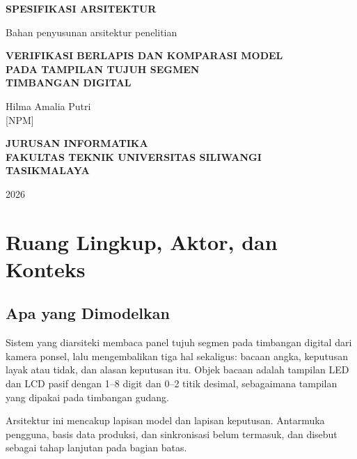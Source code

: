\documentclass[12pt,a4paper,oneside]{report}
\begin{document}
\begin{titlepage}
  \centering
  \vspace*{0.5cm}
  {\bfseries\normalsize SPESIFIKASI ARSITEKTUR\par}
  \vspace{0.4cm}
  {\normalsize Bahan penyusunan arsitektur penelitian\par}
  \vspace{1.2cm}
  {\bfseries\normalsize VERIFIKASI BERLAPIS DAN KOMPARASI MODEL\\[0.2cm]
   PADA TAMPILAN TUJUH SEGMEN\\[0.2cm] TIMBANGAN DIGITAL\par}
  \vspace{2cm}
  {\normalsize Hilma Amalia Putri\\[0.2cm] [NPM]\par}
  \vspace{2cm}
  {\bfseries\normalsize JURUSAN INFORMATIKA\\[0.2cm]
   FAKULTAS TEKNIK UNIVERSITAS SILIWANGI\\[0.2cm] TASIKMALAYA\par}
  \vspace{1cm}
  {\normalsize 2026\par}
\end{titlepage}

\pagestyle{plain}
\tableofcontents
\clearpage

\pagestyle{isita}

\chapter{Ruang Lingkup, Aktor, dan Konteks}

\section{Apa yang Dimodelkan}

Sistem yang diarsiteki membaca panel tujuh segmen pada timbangan digital dari
kamera ponsel, lalu mengembalikan tiga hal sekaligus: bacaan angka, keputusan
layak atau tidak, dan alasan keputusan itu. Objek bacaan adalah tampilan LED dan
LCD pasif dengan 1--8 digit dan 0--2 titik desimal, sebagaimana tampilan yang
dipakai pada timbangan gudang.

Arsitektur ini mencakup lapisan model dan lapisan keputusan. Antarmuka pengguna,
basis data produksi, dan sinkronisasi belum termasuk, dan disebut sebagai tahap
lanjutan pada bagian batas.
\end{document}
